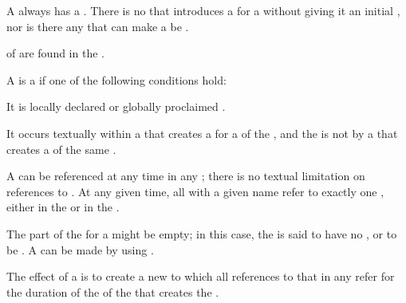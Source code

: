 A  always has a .
There is no  that introduces a  for a
 without giving it an initial , nor
is there any  that can make a  be .

 of  are found in the .

\endsubsubsubsubsection%


A  is a  if one of the following
conditions hold:

\beginlist

 \item{\bull} It is locally declared or globally proclaimed .

 \item{\bull} It occurs textually within a  that
creates a  for a  of the  ,
and the  is not  by a 
that creates a  of the same  .


\endlist

A  can be referenced at any time in any ;
there is no textual limitation on references to .
At any given time, all  with a given name refer to 
exactly one , either in the 
or in the .

The  part of the  for a  might
be empty; in this case, the  is said to have no ,
or to be .  A  can be made 
by using .
           
The effect of  a  is to create
a new  to which all references to that 
in any  refer for the duration of the  of the 
that creates the .

